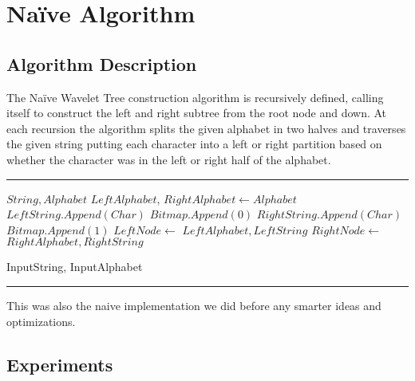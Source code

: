\section{Naïve Algorithm}

\subsection{Algorithm Description}
The Naïve Wavelet Tree construction algorithm is recursively defined, calling itself to construct the left and right subtree from the root node and down. At each recursion the algorithm splits the given alphabet in two halves and traverses the given string putting each character into a left or right partition based on whether the character was in the left or right half of the alphabet.

\noindent\rule{\textwidth}{0.5pt}
\begin{algorithmic}
 {$String, Alphabet$}
\State $LeftAlphabet$, $RightAlphabet \gets Alphabet$
\State $LeftString.Append(Char)$
\State $Bitmap.Append(0)$
\Else
\State $RightString.Append(Char)$
\State $Bitmap.Append(1)$
\EndIf
\EndFor
\State $LeftNode \gets$  {$LeftAlphabet, LeftString$}
\State $RightNode \gets$  {$RightAlphabet, RightString$}
\EndFunction

\State {} {InputString, InputAlphabet}
\end{algorithmic}
\noindent\rule{\textwidth}{0.5pt}
\linebreak

\noindent This was also the naive implementation we did before any smarter ideas and optimizations.

\subsection{Experiments}